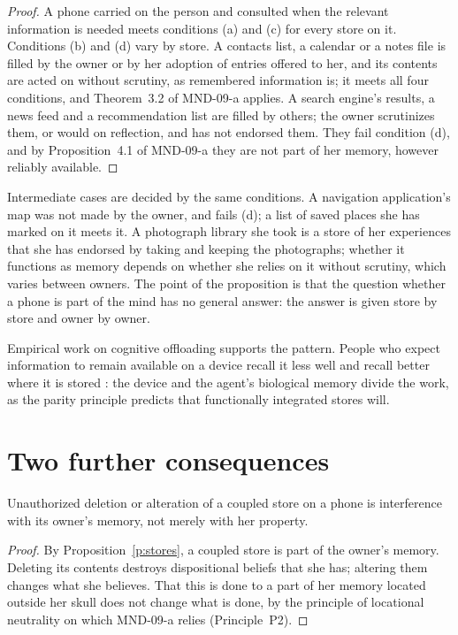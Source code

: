 \documentclass{situationist-preprint}
\begin{document}
\begin{proof}
A phone carried on the person and consulted when the relevant information is needed meets conditions (a) and (c) for every store on it. Conditions (b) and (d) vary by store. A contacts list, a calendar or a notes file is filled by the owner or by her adoption of entries offered to her, and its contents are acted on without scrutiny, as remembered information is; it meets all four conditions, and Theorem~3.2 of MND-09-a applies. A search engine's results, a news feed and a recommendation list are filled by others; the owner scrutinizes them, or would on reflection, and has not endorsed them. They fail condition (d), and by Proposition~4.1 of MND-09-a they are not part of her memory, however reliably available.
\end{proof}

Intermediate cases are decided by the same conditions. A navigation application's map was not made by the owner, and fails (d); a list of saved places she has marked on it meets it. A photograph library she took is a store of her experiences that she has endorsed by taking and keeping the photographs; whether it functions as memory depends on whether she relies on it without scrutiny, which varies between owners. The point of the proposition is that the question whether a phone is part of the mind has no general answer: the answer is given store by store and owner by owner.

Empirical work on cognitive offloading supports the pattern. People who expect information to remain available on a device recall it less well and recall better where it is stored \citep{Sparrow2011}: the device and the agent's biological memory divide the work, as the parity principle predicts that functionally integrated stores will.

\section{Two further consequences}

\begin{corollary}\label{c:harm}
Unauthorized deletion or alteration of a coupled store on a phone is interference with its owner's memory, not merely with her property.
\end{corollary}

\begin{proof}
By Proposition~\ref{p:stores}, a coupled store is part of the owner's memory. Deleting its contents destroys dispositional beliefs that she has; altering them changes what she believes. That this is done to a part of her memory located outside her skull does not change what is done, by the principle of locational neutrality on which MND-09-a relies (Principle~P2).
\end{proof}
\end{document}
